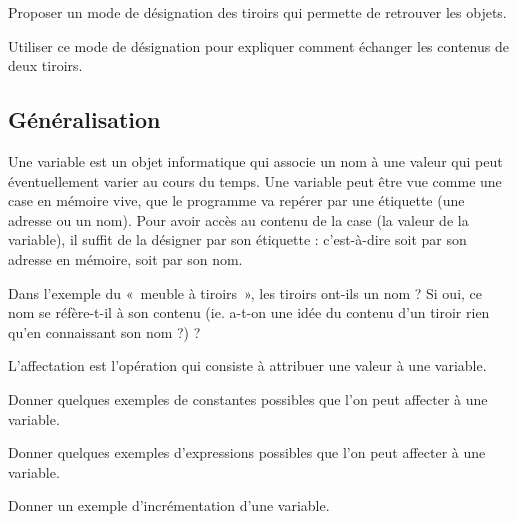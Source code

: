 \begin{question}
Proposer un mode de désignation des tiroirs qui permette de retrouver
les objets.
\end{question}

\begin{question}
Utiliser ce mode de désignation pour expliquer comment échanger les contenus de deux tiroirs.
\end{question}

\subsection{Généralisation}
Une variable est un objet informatique qui associe un nom à une valeur 
qui peut éventuellement varier au cours du temps.
Une variable peut être vue comme une case en mémoire vive, que le programme 
va repérer par une étiquette (une adresse ou un nom). Pour avoir accès au contenu de la case
(la valeur de la variable), il suffit de la désigner par son étiquette : c'est-à-dire 
soit par son adresse en mémoire, soit par son nom.

\begin{question}
Dans l'exemple du «~meuble à tiroirs~», les tiroirs ont-ils un nom ?
Si oui, ce nom se réfère-t-il à son contenu (ie. a-t-on une idée du contenu d'un tiroir
rien qu'en connaissant son nom ?) ?
\end{question}


L'affectation est l'opération qui consiste à attribuer une valeur à une variable.

\begin{question}
Donner quelques exemples de constantes possibles que l'on peut affecter à une variable.
\end{question}

\begin{question}
Donner quelques exemples d'expressions possibles que l'on peut affecter à une variable.
\end{question}

\begin{question}
Donner un exemple d'incrémentation d'une variable.
\end{question}

